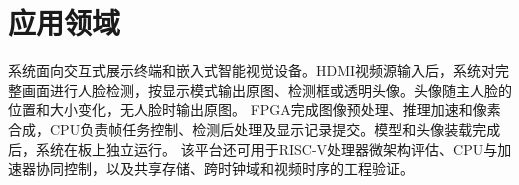 \section{应用领域}

系统面向交互式展示终端和嵌入式智能视觉设备。HDMI视频源输入后，系统对完整画面进行人脸检测，按显示模式输出原图、检测框或透明头像。头像随主人脸的位置和大小变化，无人脸时输出原图。
FPGA完成图像预处理、推理加速和像素合成，CPU负责帧任务控制、检测后处理及显示记录提交。模型和头像装载完成后，系统在板上独立运行。
该平台还可用于RISC-V处理器微架构评估、CPU与加速器协同控制，以及共享存储、跨时钟域和视频时序的工程验证。

